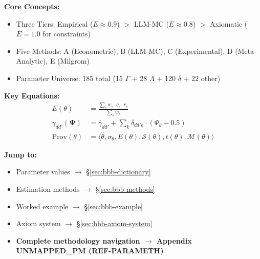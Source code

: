 \documentclass[11pt,a4paper]{article}
\theoremstyle{definition}
\begin{document}
\begin{tcolorbox}[colback=green!5!white, colframe=green!75!black, 
    title=\textbf{Quick Reference}]

\textbf{Core Concepts:}
\begin{itemize}[nosep]
    \item Three Tiers: Empirical ($E \approx 0.9$) $>$ LLM-MC ($E \approx 0.8$) $>$ Axiomatic ($E = 1.0$ for constraints)
    \item Five Methods: A (Econometric), B (LLM-MC), C (Experimental), D (Meta-Analytic), E (Milgrom)
    \item Parameter Universe: 185 total (15 $\Gamma$ + 28 $\Lambda$ + 120 $\delta$ + 22 other)
\end{itemize}

\textbf{Key Equations:}
\begin{align}
E(\theta) &= \frac{\sum_{s} w_s \cdot q_s \cdot r_s}{\sum_{s} w_s} \tag{Epistemic Status} \\
\gamma_{dd'}(\boldsymbol{\Psi}) &= \bar{\gamma}_{dd'} + \sum_{k} \delta_{dd'k} \cdot (\Psi_k - 0.5) \tag{Context Modulation} \\
\text{Prov}(\theta) &= \langle \hat{\theta}, \sigma_\theta, E(\theta), \mathcal{S}(\theta), t(\theta), \mathcal{M}(\theta) \rangle \tag{Provenance Tuple}
\end{align}

\textbf{Jump to:}
\begin{itemize}[nosep]
    \item Parameter values $\rightarrow$ \S\ref{sec:bbb-dictionary}
    \item Estimation methods $\rightarrow$ \S\ref{sec:bbb-methods}
    \item Worked example $\rightarrow$ \S\ref{sec:bbb-example}
    \item Axiom system $\rightarrow$ \S\ref{sec:bbb-axiom-system}
    \item \textbf{Complete methodology navigation $\rightarrow$ Appendix UNMAPPED_PM (REF-PARAMETH)}
\end{itemize}

\end{tcolorbox}




\end{document}
